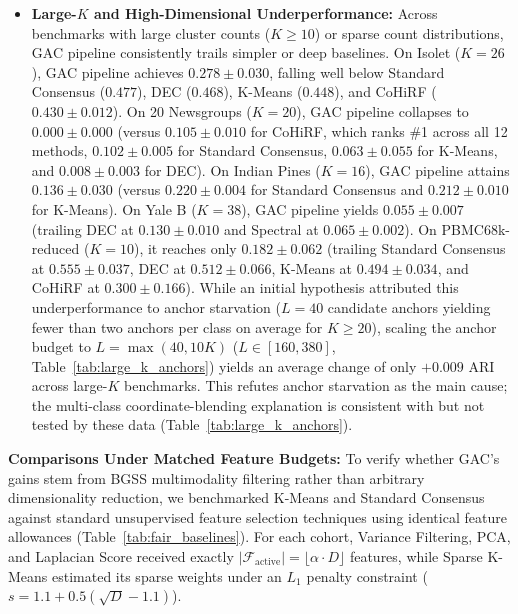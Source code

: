 \documentclass[pdflatex,sn-mathphys-num]{sn-jnl}
\theoremstyle{thmstyleone}
\theoremstyle{thmstyletwo}
\theoremstyle{thmstylethree}
\begin{document}
\begin{itemize}
 \item \textbf{Large-$K$ and High-Dimensional Underperformance:} Across benchmarks with large cluster counts ($K \ge 10$) or sparse count distributions, GAC pipeline consistently trails simpler or deep baselines. On Isolet ($K = 26$), GAC pipeline achieves $0.278 \pm 0.030$, falling well below Standard Consensus ($0.477$), DEC ($0.468$), K-Means ($0.448$), and CoHiRF ($0.430 \pm 0.012$). On 20 Newsgroups ($K = 20$), GAC pipeline collapses to $0.000 \pm 0.000$ (versus $0.105 \pm 0.010$ for CoHiRF, which ranks \#1 across all 12 methods, $0.102 \pm 0.005$ for Standard Consensus, $0.063 \pm 0.055$ for K-Means, and $0.008 \pm 0.003$ for DEC). On Indian Pines ($K = 16$), GAC pipeline attains $0.136 \pm 0.030$ (versus $0.220 \pm 0.004$ for Standard Consensus and $0.212 \pm 0.010$ for K-Means). On Yale B ($K = 38$), GAC pipeline yields $0.055 \pm 0.007$ (trailing DEC at $0.130 \pm 0.010$ and Spectral at $0.065 \pm 0.002$). On PBMC68k-reduced ($K = 10$), it reaches only $0.182 \pm 0.062$ (trailing Standard Consensus at $0.555 \pm 0.037$, DEC at $0.512 \pm 0.066$, K-Means at $0.494 \pm 0.034$, and CoHiRF at $0.300 \pm 0.166$). While an initial hypothesis attributed this underperformance to anchor starvation ($L=40$ candidate anchors yielding fewer than two anchors per class on average for $K \ge 20$), scaling the anchor budget to $L = \max(40, 10K)$ ($L \in [160, 380]$, Table~\ref{tab:large_k_anchors}) yields an average change of only $+0.009$ ARI across large-$K$ benchmarks. This refutes anchor starvation as the main cause; the multi-class coordinate-blending explanation is consistent with but not tested by these data (Table~\ref{tab:large_k_anchors}).


\end{itemize}

\textbf{Comparisons Under Matched Feature Budgets:}
To verify whether GAC's gains stem from BGSS multimodality filtering rather than arbitrary dimensionality reduction, we benchmarked K-Means and Standard Consensus against standard unsupervised feature selection techniques using identical feature allowances (Table~\ref{tab:fair_baselines}). For each cohort, Variance Filtering, PCA, and Laplacian Score received exactly $|\mathcal{F}_{\text{active}}| = \lfloor \alpha \cdot D \rfloor$ features, while Sparse K-Means estimated its sparse weights under an $L_1$ penalty constraint ($s = 1.1 + 0.5(\sqrt{D} - 1.1)$).


\end{document}
